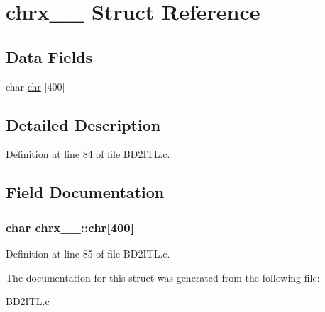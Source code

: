 \hypertarget{structchrx__1__}{}\section{chrx\+\_\+\_\+ Struct Reference}
\label{structchrx__1__}
\subsection*{Data Fields}
\begin{DoxyCompactItemize}
\item 
char \hyperlink{structchrx__1___af0917b77a3e6f48119b4ee31ddd55828}{chr} \mbox{[}400\mbox{]}
\end{DoxyCompactItemize}


\subsection{Detailed Description}


Definition at line 84 of file B\+D2\+I\+T\+L.\+c.



\subsection{Field Documentation}
\subsubsection[{\texorpdfstring{chr}{chr}}]{\setlength{\rightskip}{0pt plus 5cm}char chrx\+\_\+\_\+\+::chr\mbox{[}400\mbox{]}}\hypertarget{structchrx__1___af0917b77a3e6f48119b4ee31ddd55828}{}\label{structchrx__1___af0917b77a3e6f48119b4ee31ddd55828}


Definition at line 85 of file B\+D2\+I\+T\+L.\+c.



The documentation for this struct was generated from the following file\+:\begin{DoxyCompactItemize}
\item 
\hyperlink{BD2ITL_8c}{B\+D2\+I\+T\+L.\+c}\end{DoxyCompactItemize}
